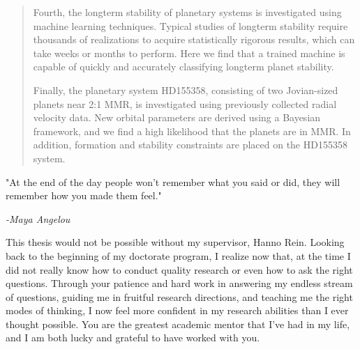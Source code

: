 \documentclass[letterpaper]{ut-thesis} %
\begin{document}
\begin{preliminary}
\begin{abstract}
Fourth, the longterm stability of planetary systems is investigated using machine learning techniques.
Typical studies of longterm stability require thousands of realizations to acquire statistically rigorous results, which can take weeks or months to perform. 
Here we find that a trained machine is capable of quickly and accurately classifying longterm planet stability. 
 
Finally, the planetary system HD155358, consisting of two Jovian-sized planets near 2:1 MMR, is investigated using previously collected radial velocity data. 
New orbital parameters are derived using a Bayesian framework, and we find a high likelihood that the planets are in MMR.
In addition, formation and stability constraints are placed on the HD155358 system.
 
\end{abstract}
\cleardoublepage



\vspace*{\fill}
\begin{center}
\begin{minipage}[c]{4.75in}
 "At the end of the day people won't remember what you said or did, they will remember how you made them feel." \vspace{1em}
 
\hfill \emph{-Maya Angelou}


\end{minipage}
\end{center}
\vspace*{\fill}

\cleardoublepage

\begin{acknowledgements}
This thesis would not be possible without my supervisor, Hanno Rein. 
Looking back to the beginning of my doctorate program, I realize now that, at the time I did not really know how to conduct quality research or even how to ask the right questions.
Through your patience and hard work in answering my endless stream of questions, guiding me in fruitful research directions, and teaching me the right modes of thinking, I now feel more confident in my research abilities than I ever thought possible. 
You are the greatest academic mentor that I've had in my life, and I am both lucky and grateful to have worked with you. 


\end{acknowledgements}
\end{preliminary}
\end{document}
